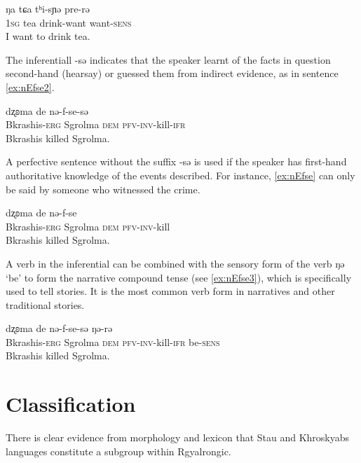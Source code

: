 \documentclass[oneside,a4paper,11pt]{article}
\newcommand{\ipa}[1]{{\phon #1}} %
\begin{document}
\begin{exe}
\ex \label{ex:prerE}
\gll
\ipa{ŋa} 	\ipa{tɕa} 	\ipa{tʰi-sɲə} 	\ipa{pre-rə} \\
\textsc{1sg} tea drink-want want-\textsc{sens} \\
\glt I want to drink tea.
\end{exe}

The inferentiall \ipa{-sə} indicates that the speaker learnt of the facts in question second-hand (hearsay) or guessed them from indirect evidence, as in sentence \ref{ex:nEfse2}.

\begin{exe}
\ex \label{ex:nEfse2}
\gll \ipa{tʂaɕi-w} 	\ipa{dʐʚma} 	\ipa{de} 	\ipa{nə-f-se-sə}  \\
Bkrashis-\textsc{erg} Sgrolma \textsc{dem} \textsc{pfv-inv}-kill-\textsc{ifr} \\
\glt Bkrashis killed Sgrolma.
\end{exe}

A perfective sentence without the suffix  \ipa{-sə} is used if the speaker has first-hand authoritative knowledge of the events described. For instance, \ref{ex:nEfse} can only be said by someone who witnessed the crime.


\begin{exe}
\ex \label{ex:nEfse}
\gll \ipa{tʂaɕi-w} 	\ipa{dʐʚma} 	\ipa{de} 	\ipa{nə-f-se}  \\
Bkrashis-\textsc{erg} Sgrolma \textsc{dem} \textsc{pfv-inv}-kill \\
\glt Bkrashis killed Sgrolma.
\end{exe}

 

A verb in the inferential can be combined with the sensory form of the verb \ipa{ŋə} `be' to form the narrative compound tense (see \ref{ex:nEfse3}), which is specifically used to tell stories. It is the most common verb form in narratives and other traditional stories.

\begin{exe}
\ex \label{ex:nEfse3}
\gll \ipa{tʂaɕi-w} 	\ipa{dʐʚma} 	\ipa{de} 	\ipa{nə-f-se-sə}  \ipa{ŋə-rə} \\
Bkrashis-\textsc{erg} Sgrolma \textsc{dem} \textsc{pfv-inv}-kill-\textsc{ifr} be-\textsc{sens} \\
\glt Bkrashis killed Sgrolma.
\end{exe}
 

 
 
 
\section{Classification} \label{sec:classification}
 There is clear evidence from morphology and lexicon that Stau and Khroskyabs languages constitute a subgroup within Rgyalrongic.
 
\end{document}
